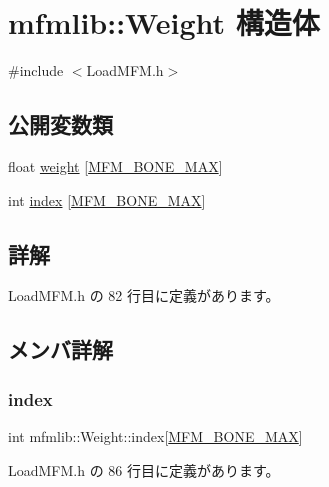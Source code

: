 \hypertarget{structmfmlib_1_1_weight}{}\section{mfmlib\+:\+:Weight 構造体}
\label{structmfmlib_1_1_weight}


{\ttfamily \#include $<$Load\+M\+F\+M.\+h$>$}

\subsection*{公開変数類}
\begin{DoxyCompactItemize}
\item 
float \mbox{\hyperlink{structmfmlib_1_1_weight_a5345575156decb810031ff9deb30f5b7}{weight}} \mbox{[}\mbox{\hyperlink{_load_m_f_m_8h_afae65bf8a30574b05ce5eb200453d4f9}{M\+F\+M\+\_\+\+B\+O\+N\+E\+\_\+\+M\+AX}}\mbox{]}
\item 
int \mbox{\hyperlink{structmfmlib_1_1_weight_a3cb8845a78f319f01f6b252f3c454e47}{index}} \mbox{[}\mbox{\hyperlink{_load_m_f_m_8h_afae65bf8a30574b05ce5eb200453d4f9}{M\+F\+M\+\_\+\+B\+O\+N\+E\+\_\+\+M\+AX}}\mbox{]}
\end{DoxyCompactItemize}


\subsection{詳解}


 Load\+M\+F\+M.\+h の 82 行目に定義があります。



\subsection{メンバ詳解}
\mbox{\label{structmfmlib_1_1_weight_a3cb8845a78f319f01f6b252f3c454e47}} 
\subsubsection{\texorpdfstring{index}{index}}
{\footnotesize\ttfamily int mfmlib\+::\+Weight\+::index\mbox{[}\mbox{\hyperlink{_load_m_f_m_8h_afae65bf8a30574b05ce5eb200453d4f9}{M\+F\+M\+\_\+\+B\+O\+N\+E\+\_\+\+M\+AX}}\mbox{]}}



 Load\+M\+F\+M.\+h の 86 行目に定義があります。

